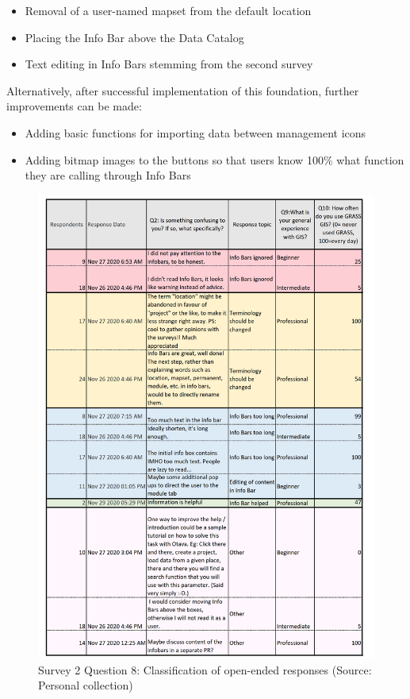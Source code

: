\documentclass[a4paper,10pt,twoside]{article}
\begin{document}
\begin{itemize}
\item Removal of a user-named mapset from the default location
\item Placing the Info Bar above the Data Catalog
\item Text editing in Info Bars stemming from the second survey
\end {itemize}

\noindent Alternatively, after successful implementation of this foundation, further improvements can be made:

\begin {itemize}
\item Adding basic functions for importing data between management icons
\item Adding bitmap images to the buttons so that users know 100\% what function they are calling through Info Bars
\end {itemize}

\newpage
\begin{figure}[hbt!] 
\begin{center}
\includegraphics[width=15cm]{../surveys/analyzed_data/survey2_question8.png} 
\caption[Survey 2 Question 8: Classification of open-ended responses]{Survey 2 Question 8: Classification of open-ended responses (Source: Personal collection)}
\label{fig:survey2_question8}
\end{center}
\end{figure}
\end{document}
